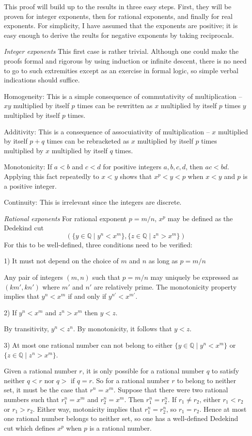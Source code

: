 \documentclass[12pt]{article}
\begin{document}
This proof will build up to the results in three easy steps.  First, they will be proven for integer exponents, then for rational exponents, and finally for real exponents.  For simplicity, I have assumed that the exponents are positive; it is easy enough to derive the reults for negative exponents by taking reciprocals.

\emph{Integer exponents}
This first case is rather trivial.  Although one could make the proofs formal and rigorous by using induction or infinite descent, there is no need to go to such extremities except as an exercise in formal logic, so simple verbal indications should suffice.

Homogeneity: This is a simple consequence of commutativity of multiplication --$xy$ multiplied by itself $p$ times can be rewritten as $x$ multiplied by itself $p$ times $y$ multiplied by itself $p$ times.

Additivity: This is a consequence of assocuiativity of multiplication -- $x$ multiplied by itself $p + q$ times can be rebracketed as $x$ multiplied by itself $p$ times multiplied by $x$ multiplied by itself $q$ times.

Monotonicity: If $a<b$ and $c<d$ for positive integers $a,b,c,d$, then $ac<bd$.  Applying this fact repeatedly to $x<y$ shows that $x^p  < y<p$ when $x<y$ and $p$ is a positive integer.

Continuity: This is irrelevant since the integers are discrete.

\emph{Rational exponents}
For rational exponent $p = m/n$, $x^p$ may be defined as the Dedekind cut
 $$( \{y \in \mathbb{Q} \mid y^n < x^m \}, \{z \in \mathbb{Q} \mid z^n > x^m \} )$$
For this to be well-defined, three conditions need to be verified:

1) It must not depend on the choice of $m$ and $n$ as long as $p = m/n$

Any pair of integers $(m,n)$ such that $p = m/n$ may uniquely be expressed as $(km',kn')$ where $m'$ and $n'$ are relatively prime.  The monotonicity property implies that $y^n < x^m$ if and only if $y^{n'} < x^{m'}$.

2) If $y^n < x^m$ and $z^n > x^m$ then $y < z$.

By transitivity, $y^n < z^n$.  By monotonicity, it follows that $y < z$.

3) At most one rational number can not belong to either $\{y \in \mathbb{Q} \mid y^n < x^m \}$ or $\{z \in \mathbb{Q} \mid z^n > x^m \}$.

Given a rational number $r$, it is only possible for a rational number $q$ to satisfy neither $q<r$ nor $q>$ if $q=r$.  So for a rational number $r$ to belong to neither set, it must be the case that $r^n = x^m$.  Suppose that there were two rational numbers such that $r_1^n = x^m$ and $r_2^n = x^m$.  Then $r_1^n = r_2^n$.  If $r_1 \neq r_2$, either $r_1<r_2$ or $r_1>r_2$.  Either way, motonicity implies that $r_1^n = r_2^n$, so $r_1 = r_2$.  Hence at most one rational number belongs to neither set, so one has a well-defined Dedekind cut which defines $x^p$ when $p$ is a rational number.
\end{document}
